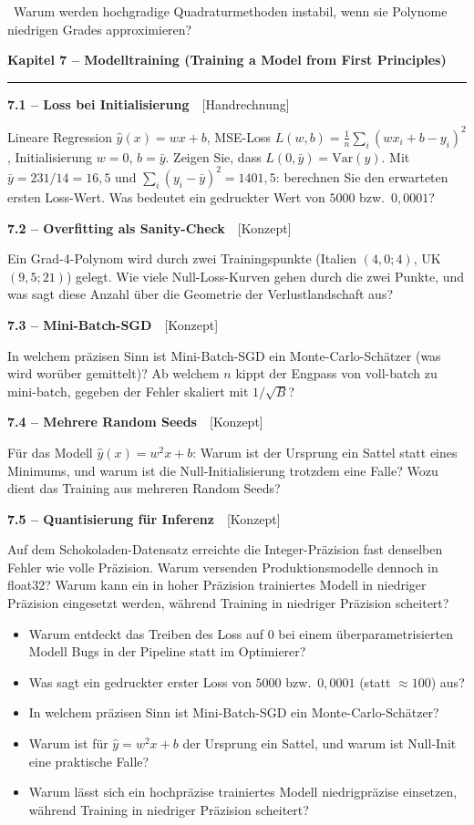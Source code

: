 \documentclass[a4paper,10pt]{article}
\newcommand{\kapitel}[1]{%
  \par\vspace{7pt}
  {\large\bfseries\color{accent} #1}\par
  \noindent\textcolor{accent}{\rule{\linewidth}{0.8pt}}\par\vspace{2pt}}
\newcommand{\aufg}[2]{%
  \par\vspace{3pt}
  {\bfseries\color{accent2} #1}~~{\footnotesize\color{accent2}[#2]}\par\vspace{1pt}}
\newcommand{\teaser}[1]{%
  \par\vspace{2pt}{\color{accent4}\textbf{Denkanstoß.}}~#1\par}
\newcommand{\reflexion}{%
  \par\vspace{2pt}{\bfseries\color{accent3} Selbstreflexionsfragen}\par\vspace{1pt}}
\begin{document}
\teaser{Warum werden hochgradige Quadraturmethoden instabil, wenn sie Polynome
niedrigen Grades approximieren?}

\kapitel{Kapitel 7 \;--\; Modelltraining (Training a Model from First Principles)}

\aufg{7.1 \;--\; Loss bei Initialisierung}{Handrechnung}
Lineare Regression $\hat y(x)=wx+b$, MSE-Loss
$L(w,b)=\tfrac1n\sum_i(wx_i+b-y_i)^2$, Initialisierung $w=0$, $b=\bar y$.
Zeigen Sie, dass $L(0,\bar y)=\mathrm{Var}(y)$. Mit $\bar y=231/14=16{,}5$ und
$\sum_i(y_i-\bar y)^2=1401{,}5$: berechnen Sie den erwarteten ersten Loss-Wert. Was
bedeutet ein gedruckter Wert von $5000$ bzw.\ $0{,}0001$?

\aufg{7.2 \;--\; Overfitting als Sanity-Check}{Konzept}
Ein Grad-4-Polynom wird durch zwei Trainingspunkte (Italien $(4{,}0;4)$, UK
$(9{,}5;21)$) gelegt. Wie viele Null-Loss-Kurven gehen durch die zwei Punkte, und was
sagt diese Anzahl über die Geometrie der Verlustlandschaft aus?

\aufg{7.3 \;--\; Mini-Batch-SGD}{Konzept}
In welchem präzisen Sinn ist Mini-Batch-SGD ein Monte-Carlo-Schätzer (was wird worüber
gemittelt)? Ab welchem $n$ kippt der Engpass von voll-batch zu mini-batch, gegeben der
Fehler skaliert mit $1/\sqrt{B}$?

\aufg{7.4 \;--\; Mehrere Random Seeds}{Konzept}
Für das Modell $\hat y(x)=w^2x+b$: Warum ist der Ursprung ein Sattel statt eines
Minimums, und warum ist die Null-Initialisierung trotzdem eine Falle? Wozu dient das
Training aus mehreren Random Seeds?

\aufg{7.5 \;--\; Quantisierung für Inferenz}{Konzept}
Auf dem Schokoladen-Datensatz erreichte die Integer-Präzision fast denselben Fehler wie
volle Präzision. Warum versenden Produktionsmodelle dennoch in float32? Warum kann ein
in hoher Präzision trainiertes Modell in niedriger Präzision eingesetzt werden, während
Training in niedriger Präzision scheitert?

\reflexion
\begin{itemize}
  \item Warum entdeckt das Treiben des Loss auf $0$ bei einem überparametrisierten
        Modell Bugs in der Pipeline statt im Optimierer?
  \item Was sagt ein gedruckter erster Loss von $5000$ bzw.\ $0{,}0001$ (statt
        $\approx100$) aus?
  \item In welchem präzisen Sinn ist Mini-Batch-SGD ein Monte-Carlo-Schätzer?
  \item Warum ist für $\hat y=w^2x+b$ der Ursprung ein Sattel, und warum ist
        Null-Init eine praktische Falle?
  \item Warum lässt sich ein hochpräzise trainiertes Modell niedrigpräzise einsetzen,
        während Training in niedriger Präzision scheitert?
\end{itemize}
\end{document}
